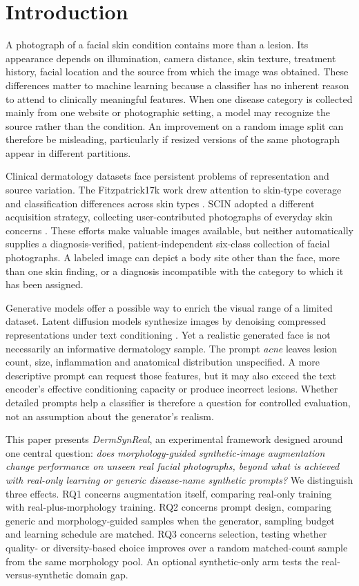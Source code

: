 \section{Introduction}
A photograph of a facial skin condition contains more than a lesion. Its appearance depends on illumination, camera distance, skin texture, treatment history, facial location and the source from which the image was obtained. These differences matter to machine learning because a classifier has no inherent reason to attend to clinically meaningful features. When one disease category is collected mainly from one website or photographic setting, a model may recognize the source rather than the condition. An improvement on a random image split can therefore be misleading, particularly if resized versions of the same photograph appear in different partitions.

Clinical dermatology datasets face persistent problems of representation and source variation. The Fitzpatrick17k work drew attention to skin-type coverage and classification differences across skin types \citep{groh2021fitzpatrick}. SCIN adopted a different acquisition strategy, collecting user-contributed photographs of everyday skin concerns \citep{ward2024scin}. These efforts make valuable images available, but neither automatically supplies a diagnosis-verified, patient-independent six-class collection of facial photographs. A labeled image can depict a body site other than the face, more than one skin finding, or a diagnosis incompatible with the category to which it has been assigned.

Generative models offer a possible way to enrich the visual range of a limited dataset. Latent diffusion models synthesize images by denoising compressed representations under text conditioning \citep{rombach2022latent}. Yet a realistic generated face is not necessarily an informative dermatology sample. The prompt \emph{acne} leaves lesion count, size, inflammation and anatomical distribution unspecified. A more descriptive prompt can request those features, but it may also exceed the text encoder's effective conditioning capacity or produce incorrect lesions. Whether detailed prompts help a classifier is therefore a question for controlled evaluation, not an assumption about the generator's realism.

This paper presents \emph{DermSynReal}, an experimental framework designed around one central question: \emph{does morphology-guided synthetic-image augmentation change performance on unseen real facial photographs, beyond what is achieved with real-only learning or generic disease-name synthetic prompts?} We distinguish three effects. RQ1 concerns augmentation itself, comparing real-only training with real-plus-morphology training. RQ2 concerns prompt design, comparing generic and morphology-guided samples when the generator, sampling budget and learning schedule are matched. RQ3 concerns selection, testing whether quality- or diversity-based choice improves over a random matched-count sample from the same morphology pool. An optional synthetic-only arm tests the real-versus-synthetic domain gap.

